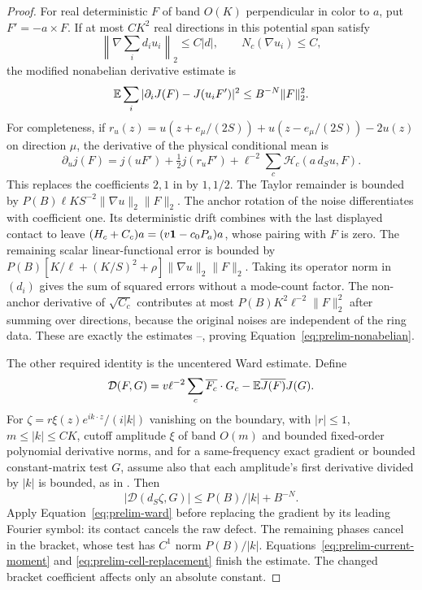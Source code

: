 \begin{proof}
For real deterministic $F$ of band $O(K)$ perpendicular in color to
$a$, put $F'=-a\times F$.
If at most $CK^2$ real directions in this potential span satisfy
\[
 \left\|\nabla\sum_i d_iu_i\right\|_2\le C|d|,
 \qquad N_c(\nabla u_i)\le C,
\]
the modified nonabelian derivative estimate is
\begin{equation}
 \mathbb E\sum_i|\partial_iJ(F)-J(u_iF')|^2
 \le B^{-N}\|F\|_2^2.
 \label{eq:prelim-nonabelian}
\end{equation}
For completeness, if
$r_u(z)=u(z+e_\mu/(2S))+u(z-e_\mu/(2S))-2u(z)$ on direction $\mu$,
the derivative of the physical conditional mean is
\[
 \partial_u j(F)=j(uF')+\tfrac12j(r_uF')
   +\ell^{-2}\sum_c\mathcal H_c(a\,d_Su,F).
\]
This replaces the coefficients $2,1$ in  by $1,1/2$.
The Taylor remainder is bounded by
$P(B)\ell KS^{-2}\|\nabla u\|_2\|F\|_2$.
The anchor rotation of the noise differentiates with coefficient one.
Its deterministic drift combines with the last displayed contact to
leave $(H_c+C_c)a=(v\mathbf 1-c_0P_a)a$, whose pairing with $F$ is zero.
The remaining scalar linear-functional error is bounded by
$P(B)[K/\ell+(K/S)^2+\rho]\|\nabla u\|_2\|F\|_2$.
Taking its operator norm in $(d_i)$ gives the sum of squared errors
without a mode-count factor. The non-anchor derivative of
$\sqrt{C_c}$ contributes at most
$P(B)K^2\ell^{-2}\|F\|_2^2$ after summing over directions, because the
original noises are independent of the ring data. These are exactly
the estimates --, proving
Equation~\eqref{eq:prelim-nonabelian}.

The other required identity is the uncentered Ward estimate. Define
\[
 \mathcal D(F,G)=v\ell^{-2}\sum_c\overline{F_c}\cdot G_c
                -\mathbb E\overline{J(F)}J(G).
\]
For $\zeta=r\xi(z)e^{ik\cdot z}/(i|k|)$ vanishing on the boundary,
with $|r|\le1$, $m\le|k|\le CK$, cutoff amplitude $\xi$ of band
$O(m)$ and bounded fixed-order polynomial derivative norms, and for a
same-frequency exact gradient or bounded constant-matrix test $G$,
assume also that each amplitude's first derivative divided by $|k|$
is bounded, as in . Then
\begin{equation}
 |\mathcal D(d_S\zeta,G)|\le P(B)/|k|+B^{-N}.
 \label{eq:prelim-frequency-ward}
\end{equation}
Apply Equation~\eqref{eq:prelim-ward} before replacing the gradient by
its leading Fourier symbol: its contact cancels the raw defect. The
remaining phases cancel in the bracket, whose test has $C^1$ norm
$P(B)/|k|$. Equations~\eqref{eq:prelim-current-moment} and
\eqref{eq:prelim-cell-replacement} finish the estimate. The changed
bracket coefficient affects only an absolute constant.


\end{proof}
